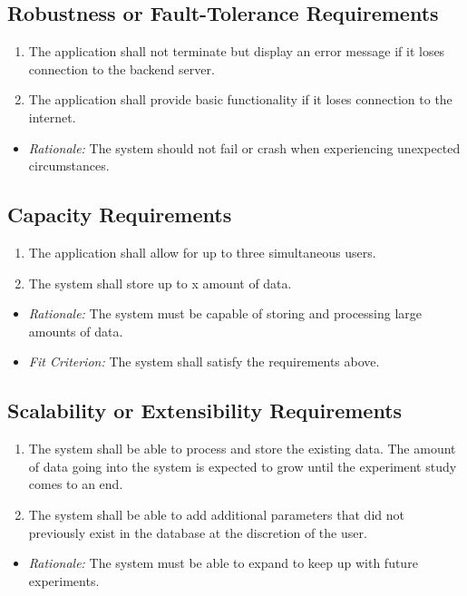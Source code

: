 \documentclass[12pt]{article}
\begin{document}
\subsection{Robustness or Fault-Tolerance Requirements}
\begin{enumerate}
  \item The application shall not terminate but display an error message if it
  loses connection to the backend server.
  \item The application shall provide basic functionality if it loses connection
  to the internet.
\end{enumerate}
\begin{itemize}
  \item \textit{Rationale:} The system should not fail or crash when
  experiencing unexpected circumstances.
\end{itemize}

\subsection{Capacity Requirements}
\begin{enumerate}
  \item The application shall allow for up to three simultaneous users.
  \item The system shall store up to x amount of data.
\end{enumerate}
\begin{itemize}
  \item \textit{Rationale:} The system must be capable of storing and processing
  large amounts of data.
  \item \textit{Fit Criterion:} The system shall satisfy the requirements above.
\end{itemize}

\subsection{Scalability or Extensibility Requirements}
\begin{enumerate}
  \item The system shall be able to process and store the existing data. The
  amount of data going into the system is expected to grow until the experiment
  study comes to an end.
  \item The system shall be able to add additional parameters that did not
  previously exist in the database at the discretion of the user.
\end{enumerate}
\begin{itemize}
  \item \textit{Rationale:} The system must be able to expand to keep up with
  future experiments.
\end{itemize}
\end{document}
